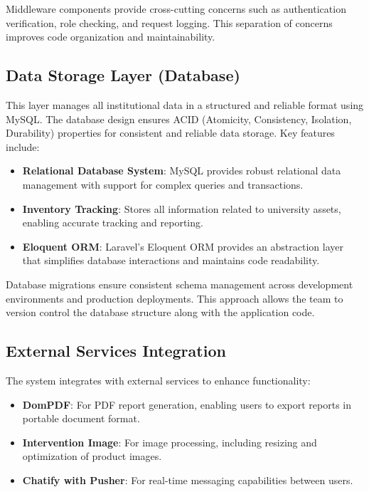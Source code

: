 Middleware components provide cross-cutting concerns such as authentication verification, role checking, and request logging. This separation of concerns improves code organization and maintainability.

\subsection{Data Storage Layer (Database)}

This layer manages all institutional data in a structured and reliable format using MySQL. The database design ensures ACID (Atomicity, Consistency, Isolation, Durability) properties for consistent and reliable data storage. Key features include:

\begin{itemize}
    \item \textbf{Relational Database System}: MySQL provides robust relational data management with support for complex queries and transactions.
    \item \textbf{Inventory Tracking}: Stores all information related to university assets, enabling accurate tracking and reporting.
    \item \textbf{Eloquent ORM}: Laravel's Eloquent ORM provides an abstraction layer that simplifies database interactions and maintains code readability.
\end{itemize}

Database migrations ensure consistent schema management across development environments and production deployments. This approach allows the team to version control the database structure along with the application code.

\subsection{External Services Integration}

The system integrates with external services to enhance functionality:

\begin{itemize}
    \item \textbf{DomPDF}: For PDF report generation, enabling users to export reports in portable document format.
    \item \textbf{Intervention Image}: For image processing, including resizing and optimization of product images.
    \item \textbf{Chatify with Pusher}: For real-time messaging capabilities between users.
\end{itemize}

